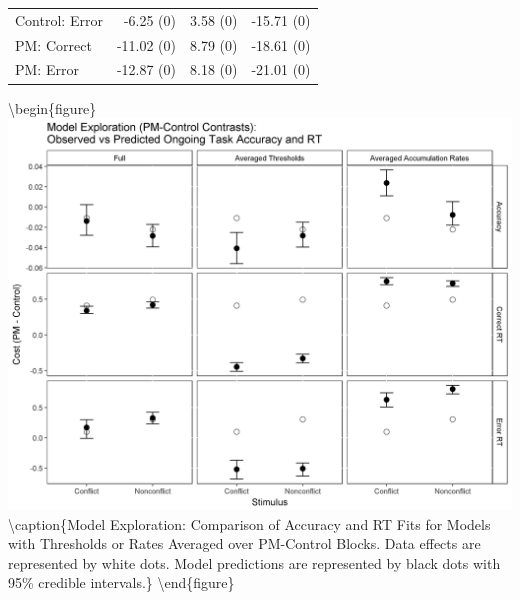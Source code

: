 \documentclass[11pt,]{article}
\begin{document}
\begin{longtable}[]{@{}lrrr@{}}
\begin{minipage}[t]{0.21\columnwidth}\raggedright\strut
Control: Error\strut
\end{minipage} & \begin{minipage}[t]{0.14\columnwidth}\raggedleft\strut
-6.25 (0)\strut
\end{minipage} & \begin{minipage}[t]{0.16\columnwidth}\raggedleft\strut
3.58 (0)\strut
\end{minipage} & \begin{minipage}[t]{0.12\columnwidth}\raggedleft\strut
-15.71 (0)\strut
\end{minipage}\tabularnewline
\begin{minipage}[t]{0.21\columnwidth}\raggedright\strut
PM: Correct\strut
\end{minipage} & \begin{minipage}[t]{0.14\columnwidth}\raggedleft\strut
-11.02 (0)\strut
\end{minipage} & \begin{minipage}[t]{0.16\columnwidth}\raggedleft\strut
8.79 (0)\strut
\end{minipage} & \begin{minipage}[t]{0.12\columnwidth}\raggedleft\strut
-18.61 (0)\strut
\end{minipage}\tabularnewline
\begin{minipage}[t]{0.21\columnwidth}\raggedright\strut
PM: Error\strut
\end{minipage} & \begin{minipage}[t]{0.14\columnwidth}\raggedleft\strut
-12.87 (0)\strut
\end{minipage} & \begin{minipage}[t]{0.16\columnwidth}\raggedleft\strut
8.18 (0)\strut
\end{minipage} & \begin{minipage}[t]{0.12\columnwidth}\raggedleft\strut
-21.01 (0)\strut
\end{minipage}\tabularnewline
\bottomrule
\end{longtable}

\textbackslash{}begin\{figure\}
\includegraphics[width=0.5\linewidth]{figures/E1/E1.PM.Control.Contrast.Plots}
\textbackslash{}caption\{\label{fig:PM.Control.Contrast.Plots}Model
Exploration: Comparison of Accuracy and RT Fits for Models with
Thresholds or Rates Averaged over PM-Control Blocks. Data effects are
represented by white dots. Model predictions are represented by black
dots with 95\% credible
intervals.\}\label{fig:Plot: Model Exploration PM Contrasts}
\textbackslash{}end\{figure\}
\end{document}
